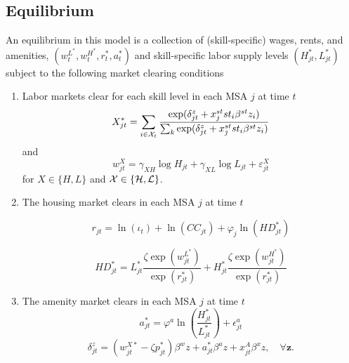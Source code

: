 \documentclass{article}
\begin{document}
\subsection{Equilibrium}
An equilibrium in this model is a collection of (skill-specific) wages, rents, and amenities, $(w_t^{L^*},w_t^{H^*},r_t^*,a_t^*)$ and skill-specific labor supply levels $(H_{jt}^*,L_{jt}^*)$ subject to the following market clearing conditions 
\begin{enumerate}
\item Labor markets clear for each skill level in each MSA $j$ at time $t$ 
$$ X_{jt}^*  = \sum_{i\in\mathcal{X}_t} \frac{\exp(\delta_{jt}^z + x_j^{st}st_i\beta^{st}z_i)}{\sum_{k} \exp(\delta_{jt}^z + x_j^{st}st_i\beta^{st}z_i)}$$
and 
$$w_{jt}^X = \gamma_{X H}\log H_{jt} + \gamma_{X L} \log L_{jt} + \varepsilon_{jt}^X$$
for $X \in \{H, L\}$ and $\mathcal{X} \in \{\mathcal{H}, \mathcal{L}\}$. 
\item The housing market clears in each MSA $j$ at time $t$

$$ r_{jt} = \ln(\iota_t) + \ln(CC_{jt}) + \varphi_j\ln (HD^*_{jt})$$

$$ HD_{jt}^* = L_{jt}^* \frac{\zeta \exp(w_{jt}^{L^*})}{\exp(r_{jt}^*)} + H_{jt}^* \frac{\zeta \exp(w_{jt}^{H^*})}{\exp(r_{jt}^*)}$$

\item The amenity market clears in each MSA $j$ at time $t$
$$a_{jt}^* = \varphi^a \ln\left(\frac{H_{jt}^*}{L_{jt}^*}\right) + \epsilon_{jt}^a$$
$$\delta_{jt}^z = (w^{X*}_{jt} - \zeta p_{jt}^*)\beta^w z + a_{jt}^* \beta^a z + x_{jt}^A\beta^xz, \quad \forall \bm{z}.$$
\end{enumerate}





\end{document}
